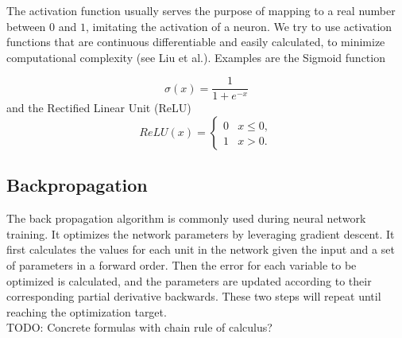 The activation function usually serves the purpose of mapping to a real number between $0$ and $1$, imitating the activation of a neuron. We try to use activation functions that are continuous differentiable and easily calculated, to minimize computational complexity (see Liu et al.\cite{Liu2020}). Examples are the Sigmoid function

\begin{equation}
    \sigma (x)= \frac{1}{1+e^{-x}}
\end{equation}
and the Rectified Linear Unit (ReLU)
\begin{equation}
    ReLU(x)=\begin{cases}
        0 & x \leq 0, \\
        1 & x > 0.
    \end{cases}
\end{equation}



\subsection{Backpropagation}
The back propagation algorithm is commonly used during neural network training. It optimizes the network parameters by leveraging gradient descent. It first calculates the values for each unit in the network given the input and a set of parameters in a forward order. Then the error for each variable to be optimized is calculated, and the parameters are updated according to their corresponding partial derivative backwards. These two steps will repeat until reaching the optimization target. \\
TODO: Concrete formulas with chain rule of calculus? 

